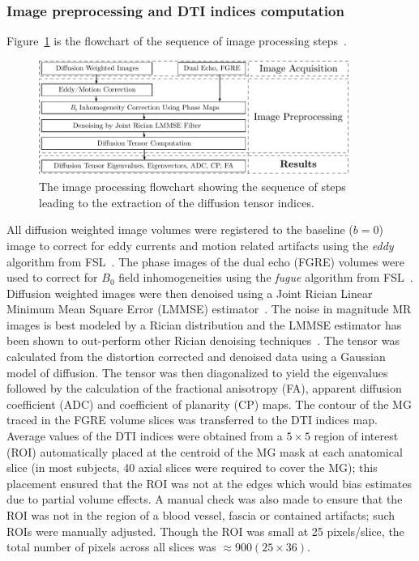 \subsubsection{Image preprocessing and DTI indices computation}
Figure~\ref{fig: DTI-flowchart} is the flowchart of the sequence of image processing steps~\cite{DTI}.
\begin{figure}[!h]
\vspace{+0.2cm}
\centering
\includegraphics[width=0.9\textwidth]{Figures/DTI_flowchart.pdf}
\caption[The image processing flowchart showing the sequence of steps leading to the extraction of the diffusion tensor indices]{The image processing flowchart showing the sequence of steps leading to the extraction of the diffusion tensor indices.}
\label{fig: DTI-flowchart}
\end{figure}
All diffusion weighted image volumes were registered to the baseline ($b=0$) image to correct for eddy currents and motion related artifacts using the \textit{eddy} algorithm from FSL~\cite{RND23}. 
The phase images of the dual echo (FGRE) volumes were used to correct for $B_0$ field inhomogeneities using the \textit{fugue} algorithm from FSL~\cite{RND23}.
Diffusion weighted images were then denoised using a Joint Rician Linear Minimum Mean Square Error (LMMSE) estimator~\cite{RND24}. 
The noise in magnitude MR images is best modeled by a Rician distribution and the LMMSE estimator has been shown to out-perform other Rician denoising techniques~\cite{RND25}.
The tensor was calculated from the distortion corrected and denoised data using a Gaussian model of diffusion.
The tensor was then diagonalized to yield the eigenvalues followed by the calculation of the fractional anisotropy (FA), apparent diffusion coefficient (ADC) and coefficient of planarity (CP) maps. 
The contour of the MG traced in the FGRE volume slices was transferred to the DTI indices map.
Average values of the DTI indices were obtained from a $5 \times 5$ region of interest (ROI) automatically placed at the centroid of the MG mask at each anatomical slice (in most subjects, 40 axial slices were required to cover the MG); this placement ensured that the ROI was not at the edges which would bias estimates due to partial volume effects. 
A manual check was also made to ensure that the ROI was not in the region of a blood vessel, fascia or contained artifacts; such ROIs were manually adjusted. 
Though the ROI was small at 25 pixels/slice, the total number of pixels across all slices was $\approx 900 (25 \times 36)$. 
